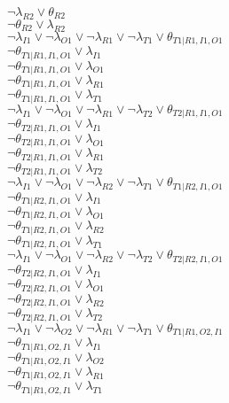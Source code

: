 $\neg\lambda_{R2} \vee \theta_{R2}$\\
$\neg\theta_{R2} \vee \lambda_{R2}$\\
$\neg\lambda_{I1} \vee \neg\lambda_{O1} \vee \neg\lambda_{R1} \vee \neg\lambda_{T1} \vee \theta_{T1|R1,I1,O1}$\\
$\neg\theta_{T1|R1,I1,O1} \vee \lambda_{I1}$\\
$\neg\theta_{T1|R1,I1,O1} \vee \lambda_{O1}$\\
$\neg\theta_{T1|R1,I1,O1} \vee \lambda_{R1}$\\
$\neg\theta_{T1|R1,I1,O1} \vee \lambda_{T1}$\\
$\neg\lambda_{I1} \vee \neg\lambda_{O1} \vee \neg\lambda_{R1} \vee \neg\lambda_{T2} \vee \theta_{T2|R1,I1,O1}$\\
$\neg\theta_{T2|R1,I1,O1} \vee \lambda_{I1}$\\
$\neg\theta_{T2|R1,I1,O1} \vee \lambda_{O1}$\\
$\neg\theta_{T2|R1,I1,O1} \vee \lambda_{R1}$\\
$\neg\theta_{T2|R1,I1,O1} \vee \lambda_{T2}$\\
$\neg\lambda_{I1} \vee \neg\lambda_{O1} \vee \neg\lambda_{R2} \vee \neg\lambda_{T1} \vee \theta_{T1|R2,I1,O1}$\\
$\neg\theta_{T1|R2,I1,O1} \vee \lambda_{I1}$\\
$\neg\theta_{T1|R2,I1,O1} \vee \lambda_{O1}$\\
$\neg\theta_{T1|R2,I1,O1} \vee \lambda_{R2}$\\
$\neg\theta_{T1|R2,I1,O1} \vee \lambda_{T1}$\\
$\neg\lambda_{I1} \vee \neg\lambda_{O1} \vee \neg\lambda_{R2} \vee \neg\lambda_{T2} \vee \theta_{T2|R2,I1,O1}$\\
$\neg\theta_{T2|R2,I1,O1} \vee \lambda_{I1}$\\
$\neg\theta_{T2|R2,I1,O1} \vee \lambda_{O1}$\\
$\neg\theta_{T2|R2,I1,O1} \vee \lambda_{R2}$\\
$\neg\theta_{T2|R2,I1,O1} \vee \lambda_{T2}$\\
$\neg\lambda_{I1} \vee \neg\lambda_{O2} \vee \neg\lambda_{R1} \vee \neg\lambda_{T1} \vee \theta_{T1|R1,O2,I1}$\\
$\neg\theta_{T1|R1,O2,I1} \vee \lambda_{I1}$\\
$\neg\theta_{T1|R1,O2,I1} \vee \lambda_{O2}$\\
$\neg\theta_{T1|R1,O2,I1} \vee \lambda_{R1}$\\
$\neg\theta_{T1|R1,O2,I1} \vee \lambda_{T1}$\\
